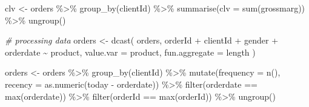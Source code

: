 \documentclass[
]{book}
\newenvironment{Shaded}{\begin{snugshade}}{\end{snugshade}}
\newcommand{\AttributeTok}[1]{\textcolor[rgb]{0.77,0.63,0.00}{#1}}
\newcommand{\CommentTok}[1]{\textcolor[rgb]{0.56,0.35,0.01}{\textit{#1}}}
\newcommand{\FunctionTok}[1]{\textcolor[rgb]{0.00,0.00,0.00}{#1}}
\newcommand{\NormalTok}[1]{#1}
\newcommand{\OtherTok}[1]{\textcolor[rgb]{0.56,0.35,0.01}{#1}}
\newcommand{\SpecialCharTok}[1]{\textcolor[rgb]{0.00,0.00,0.00}{#1}}
\newcommand{\StringTok}[1]{\textcolor[rgb]{0.31,0.60,0.02}{#1}}
\begin{document}
\begin{Shaded}
\begin{Highlighting}[]
\NormalTok{clv }\OtherTok{\textless{}{-}}\NormalTok{ orders }\SpecialCharTok{\%\textgreater{}\%}
    \FunctionTok{group\_by}\NormalTok{(clientId) }\SpecialCharTok{\%\textgreater{}\%}
    \FunctionTok{summarise}\NormalTok{(}\AttributeTok{clv =} \FunctionTok{sum}\NormalTok{(grossmarg)) }\SpecialCharTok{\%\textgreater{}\%}
    \FunctionTok{ungroup}\NormalTok{()}

\CommentTok{\# processing data}
\NormalTok{orders }\OtherTok{\textless{}{-}}
    \FunctionTok{dcast}\NormalTok{(}
\NormalTok{        orders,}
\NormalTok{        orderId }\SpecialCharTok{+}\NormalTok{ clientId }\SpecialCharTok{+}\NormalTok{ gender }\SpecialCharTok{+}\NormalTok{ orderdate }\SpecialCharTok{\textasciitilde{}}\NormalTok{ product,}
        \AttributeTok{value.var =} \StringTok{\textquotesingle{}product\textquotesingle{}}\NormalTok{,}
        \AttributeTok{fun.aggregate =}\NormalTok{ length}
\NormalTok{    )}

\NormalTok{orders }\OtherTok{\textless{}{-}}\NormalTok{ orders }\SpecialCharTok{\%\textgreater{}\%}
    \FunctionTok{group\_by}\NormalTok{(clientId) }\SpecialCharTok{\%\textgreater{}\%}
    \FunctionTok{mutate}\NormalTok{(}\AttributeTok{frequency =} \FunctionTok{n}\NormalTok{(),}
           \AttributeTok{recency =} \FunctionTok{as.numeric}\NormalTok{(today }\SpecialCharTok{{-}}\NormalTok{ orderdate)) }\SpecialCharTok{\%\textgreater{}\%}
    \FunctionTok{filter}\NormalTok{(orderdate }\SpecialCharTok{==} \FunctionTok{max}\NormalTok{(orderdate)) }\SpecialCharTok{\%\textgreater{}\%}
    \FunctionTok{filter}\NormalTok{(orderId }\SpecialCharTok{==} \FunctionTok{max}\NormalTok{(orderId)) }\SpecialCharTok{\%\textgreater{}\%}
    \FunctionTok{ungroup}\NormalTok{()}


\end{Highlighting}
\end{Shaded}
\end{document}
